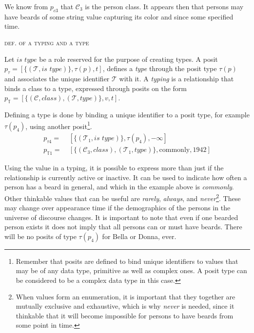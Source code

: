 \documentclass[sfsidenotes,nobib,twoside,symmetric]{tufte-handout}
\newcommand{\typeof}[1]{\tau(#1)}
\newcounter{majorcount}
\newcommand{\deffy}[3]{
	\vspace{2ex}
	\refstepcounter{majorcount} 
	\noindent\textsc{#1}%
	\\\begin{small}
	\noindent #2%
	\label{Def:#3}
	\end{small}
	\vspace{2ex}
}
\begin{document}
We know from $p_{c3}$ that $\mathcal{C}_3$ is the person class. It appears then that persons may have beards of some string value capturing its color and since some specified time.

\deffy{def. of a typing and a type}{%
Let $\textit{is type}$ be a role reserved for the purpose of creating types. A posit $p_{\tau} = [\{(\mathcal{T}, \textit{is type})\}, \tau(p), t]$, defines a \emph{type} through the posit type $\tau(p)$ and associates the unique identifier $\mathcal{T}$ with it. A \emph{typing} is a relationship that binds a class to a type, expressed through posits on the form $p_{\mathbb{T}} = [\{(\mathcal{C}, \textit{class}), (\mathcal{T}, \textit{type})\}, v, t]$.
}{typing}

Defining a type is done by binding a unique identifier to a posit type, for example $\typeof{p_{4}}$, using another posit\footnote{Remember that posits are defined to bind unique identifiers to values that may be of any data type, primitive as well as complex ones. A posit type can be considered to be a complex data type in this case.}. 
\begin{align*}
p_{\tau4} =\;& [\{(\mathcal{T}_1, \textit{is type})\}, \typeof{p_{4}}, -\infty] \\
p_{\mathbb{T}1} =\;& [\{(\mathcal{C}_3, \textit{class}), (\mathcal{T}_1, \textit{type})\}, \textrm{commonly}, \textrm{1942}]
\end{align*}

Using the value in a typing, it is possible to express more than just if the relationship is currently active or inactive. It can be used to indicate how often a person has a beard in general, and which in the example above is \emph{commonly}. Other thinkable values that can be useful are \emph{rarely}, \emph{always}, and \emph{never}\footnote{When values form an enumeration, it is important that they together are mutually exclusive and exhaustive, which is why \emph{never} is needed, since it thinkable that it will become impossible for persons to have beards from some point in time.}. These may change over appearance time if the demographics of the persons in the universe of discourse changes.  It is important to note that even if one bearded person exists it does not imply that all persons can or must have beards. There will be no posits of type $\typeof{p_{4}}$ for Bella or Donna, ever. 
\end{document}
